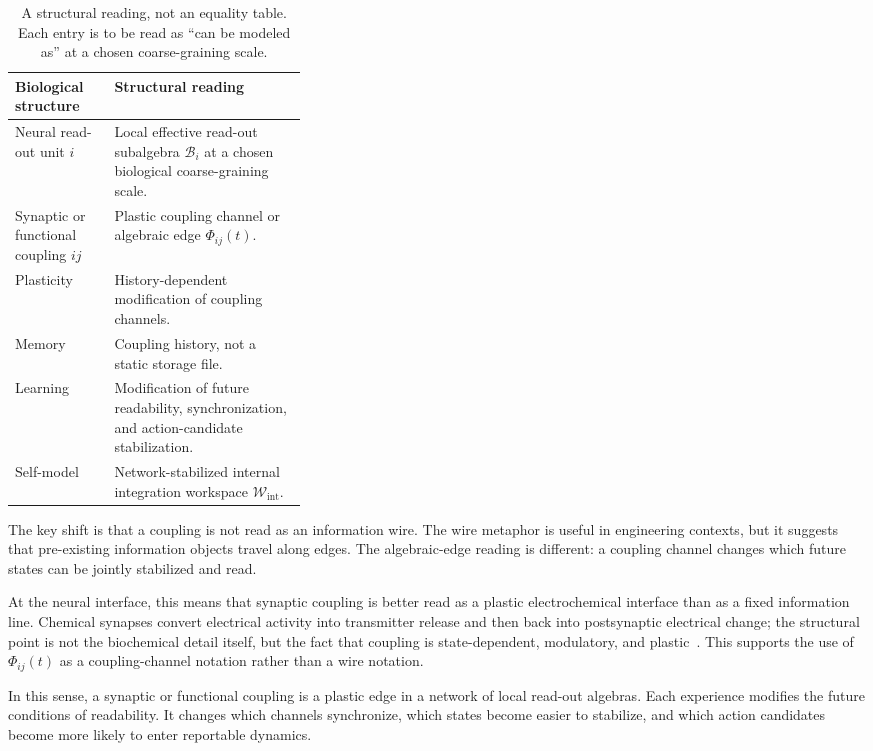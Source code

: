 \documentclass[12pt]{article}
\theoremstyle{definition}
\theoremstyle{remark}
\newcommand{\Wint}{\mathcal W_{\mathrm{int}}}
\begin{document}
\begin{table}[H]
\centering
\begin{tabularx}{0.96\linewidth}{P{0.34\linewidth}Y}
\toprule
\textbf{Biological structure} & \textbf{Structural reading} \\
\midrule
Neural read-out unit \(i\) &
Local effective read-out subalgebra \(\mathcal B_i\) at a chosen biological coarse-graining scale. \\
Synaptic or functional coupling \(ij\) &
Plastic coupling channel or algebraic edge \(\Phi_{ij}(t)\). \\
Plasticity &
History-dependent modification of coupling channels. \\
Memory &
Coupling history, not a static storage file. \\
Learning &
Modification of future readability, synchronization, and action-candidate stabilization. \\
Self-model &
Network-stabilized internal integration workspace \(\Wint\). \\
\bottomrule
\end{tabularx}
\caption{A structural reading, not an equality table. Each entry is to be
read as ``can be modeled as'' at a chosen coarse-graining scale.}
\end{table}

The key shift is that a coupling is not read as an information wire. The
wire metaphor is useful in engineering contexts, but it suggests that
pre-existing information objects travel along edges. The algebraic-edge
reading is different: a coupling channel changes which future states can
be jointly stabilized and read.

At the neural interface, this means that synaptic coupling is better
read as a plastic electrochemical interface than as a fixed information
line. Chemical synapses convert electrical activity into transmitter
release and then back into postsynaptic electrical change; the
structural point is not the biochemical detail itself, but the fact that
coupling is state-dependent, modulatory, and plastic~\cite{Sudhof2012,Sudhof2013}.
This supports the use of \(\Phi_{ij}(t)\) as
a coupling-channel notation rather than a wire notation.

In this sense, a synaptic or functional coupling is a plastic edge in a
network of local read-out algebras. Each experience modifies the future
conditions of readability. It changes which channels synchronize, which
states become easier to stabilize, and which action candidates become
more likely to enter reportable dynamics.
\end{document}
